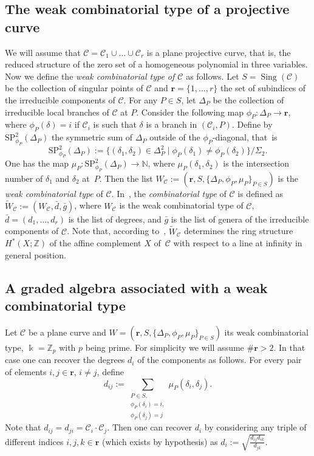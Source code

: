 \documentclass[11pt]{amsart}
\DeclareMathOperator{\Sing}{Sing}
\newcommand{\SP}{\textrm {SP}}
\def\cC{\mathcal{C}}
\def\ZZ{\mathbb{Z}}
\def\NN{\mathbb{N}}
\def\kk{\Bbbk}
\theoremstyle{plain}
\theoremstyle{definition}
\begin{document}
\subsection{The weak combinatorial type of a projective curve}
\label{ss:weak_comb}
We will assume that $\cC=\cC_1\cup \ldots \cup\cC_r$ is a plane projective curve, that is, the reduced structure of the zero set of a homogeneous polynomial in three variables. Now we define the
\emph{weak combinatorial type of $\cC$} as follows.
Let $S=\Sing(\cC)$ be the collection of singular points of $\cC$ and $\mathbf r=\{1,...,r\}$ the set of
subindices of the irreducible components of $\cC$.
For any $P\in S$, let $\Delta_P$ be the collection of irreducible local branches of $\cC$ at $P$.
Consider the following map $\phi_P:\Delta_P\to \mathbf r$, where $\phi_P(\delta)=i$ if $\cC_i$ is such that $\delta$ is a branch in $(\cC_i,P)$. Define by $\SP^2_{\phi_P}(\Delta_P)$ the symmetric
sum of $\Delta_P$ outside of the $\phi_P$-diagonal, that~is
$$
\SP^2_{\phi_P}(\Delta_P):=\{(\delta_1,\delta_2)\in \Delta_P^2\mid \phi_P(\delta_1)\neq\phi_P(\delta_2)\}/\Sigma_2.
$$
One has the map $\mu_P:\SP^2_{\phi_P}(\Delta_P)\to \NN$, where $\mu_P(\delta_1,\delta_2)$ is the intersection
number of $\delta_1$ and $\delta_2$ at~$P$.
Then the list $W_\cC:=(\mathbf r,S,\{\Delta_P,\phi_P,\mu_P\}_{P\in S})$ is the \emph{weak combinatorial type} of $\cC$.
In~\cite{CM}, the \emph{combinatorial type} of $\cC$ is defined as $\tilde W_\cC:=(W_\cC,\bar d,\bar g)$, where $W_\cC$ is the weak combinatorial type of $\cC$, $\bar d = (d_1,\dots,d_r)$ is the list of degrees, and $\bar g$ is the list of genera of the irreducible components of $\cC$. Note that, according to~\cite{CM}, $\tilde W_\cC$ determines the ring structure $H^*(X;\ZZ)$ of the affine complement $X$ of~$\cC$ with respect to a line at infinity in general position.

\subsection{A graded algebra associated with a weak combinatorial type}
\label{subsect:GAC}
Let $\cC$ be a plane curve and $W=(\mathbf r,S,\{\Delta_P,\phi_P,\mu_P\}_{P\in S})$ its weak combinatorial type,
$\kk=\ZZ_p$ with $p$ being prime. 
For simplicity we will assume $\# \mathbf r>2$. In that case one can recover the degrees $d_i$ of the components as follows. For every pair of elements $i,j\in \mathbf r$, $i\neq j$, define $$d_{ij}:=\sum_{\substack{P \in S,\\  \phi_P(\delta_i)=i,\\ 
\phi_P(\delta_j)=j}}
\mu_P(\delta_i,\delta_j).$$
Note that $d_{ij}=d_{ji}=\cC_i\cdot \cC_j$. Then one can recover $d_i$ by considering any triple of different indices $i,j,k\in \mathbf r$ (which exists by hypothesis) as
$
d_i:=\sqrt{\frac{d_{ij}d_{ik}}{d_{jk}}}.
$
\end{document}
